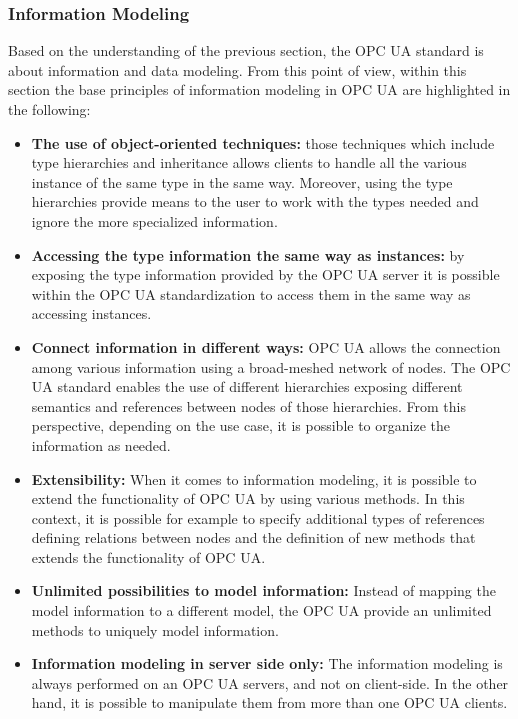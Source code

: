 \subsubsection{Information Modeling}
 Based on the understanding of the previous section, the OPC UA standard is about information and data modeling. From this point of view, within this section the base principles of information modeling in OPC UA are highlighted in the following:
\begin{itemize}
\item \textbf{The use of object-oriented techniques:} those techniques which include type hierarchies and inheritance allows clients to handle all the various instance of the same type in the same way. Moreover, using the type hierarchies provide means to the user to work with the types needed and ignore the more specialized information.
\item \textbf{Accessing the type information the same way as instances:} by exposing the type information provided by the OPC UA server it is possible within the OPC UA standardization to access them in the same way as accessing instances. 
\item \textbf{Connect information in different ways:} OPC UA allows the connection among various information using a broad-meshed network of nodes. The OPC UA standard enables the use of different hierarchies exposing different semantics and references between nodes of those hierarchies. From this perspective, depending on the use case, it is possible to organize the information as needed. 
\item \textbf{Extensibility:} When it comes to information modeling, it is possible to extend the functionality of OPC UA by using various methods. In this context, it is possible for example to specify additional types of references defining relations between nodes and the definition of new methods that extends the functionality of OPC UA.
\item \textbf{Unlimited possibilities to model information:} Instead of mapping the model information to a different model, the OPC UA provide an unlimited methods to uniquely model information.
\item \textbf{Information modeling in server side only:} The information modeling is always performed on an OPC UA servers, and not on client-side. In the other hand, it is possible to manipulate them from more than one OPC UA clients.
\end{itemize}
